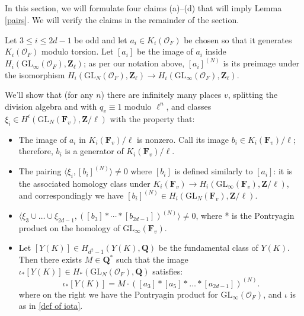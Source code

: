 \documentclass[10pt]{amsart}
\newcommand{\Z}{\mathbf{Z}}
\newcommand{\Q}{\mathbf{Q}}
\newcommand{\OO}{\mathcal{O}}
\newcommand{\GL}{\mathrm{GL}}
\theoremstyle{remark}
\begin{document}
 





 
%
%
%
%
%
%


 
 
\subsection{} \label{abcd} 
In this section, we will formulate four claims (a)--(d) that will imply Lemma \ref{pairs}. We will verify the claims in the remainder of the section. 


Let $3 \leq i \leq 2d-1$ be odd and
let $a_i \in K_i(\mathcal{O}_F) $ be  chosen so that it generates $K_i(\mathcal{O}_F)$ modulo torsion. 
Let $[a_i]$ be the image of $a_i$ inside $ H_i(\GL_{\infty}(\mathcal{O}_F), \Z_{\ell})$;
as per our notation above, 
 $[a_i]^{(N)}$ is  its preimage under the isomorphism $H_i(\GL_N(\mathcal{O}_F),\Z_{\ell}) \rightarrow H_i(\GL_{\infty}(\OO_F),\Z_{\ell})$. 
%
%



We'll show that (for any $n$) there are  infinitely many places $v$, splitting the division algebra and with $q_v \equiv 1$ modulo $\ell^n$, 
and classes  $\xi_i \in H^i( \GL_N(\mathbf{F}_v),  \Z/\ell)$ with the property that:

\begin{itemize}
\item[(a)]  The image of $a_i$ in $K_i(\mathbf{F}_v)/\ell$ is nonzero. 
Call its image $b_i \in K_i(\mathbf{F}_v)/\ell$; therefore, 
 $b_i$  is a generator of $K_i(\mathbf{F}_v)/\ell$.
 
\item[(b)]  The pairing $ \langle \xi_i, [b_i]^{(N)} \rangle \neq 0$
where $[b_i]$ is  defined similarly to  $[a_i]$: it is the associated homology class
under $K_i(\mathbf{F}_v)  \rightarrow H_i (\GL_{\infty}(\mathbf{F}_v),\Z/\ell)$,
and correspondingly we have $[b_i]^{(N)} \in H_i(\GL_N(\mathbf{F}_v), \Z/\ell)$. 


\item[(c)]  $ \langle \xi_3 \cup \dots  \cup \xi_{2d-1} ,  \left(  [b_3]  * \cdots *  [b_{2d-1}] \right)^{(N)} \rangle \neq 0$,
where * is  the  Pontryagin product on the homology of $\GL_{\infty}(\mathbf{F}_v)$. 
 
\item[(d)]  
Let $[Y(K)] \in H_{d^2-1}(Y(K), \Q)$ be the fundamental class of $Y(K)$. Then 
there exists $M \in \Q^*$ such that
the image $\iota_* [Y(K)] \in  H_*(\GL_N(\mathcal{O}_F) ,\Q) $   satisfies:
\begin{equation} \label{Mdef}  \iota_* [Y(K)] = M \cdot   \left(  [a_3] *[a_5] * \dots * [a_{2d-1}] \right)^{(N)}. \end{equation}
where on the right we have the Pontryagin product for $\GL_{\infty}(\mathcal{O}_F)$, and $\iota$
is as in \eqref{def of iota}.
\end{itemize}
\end{document}
